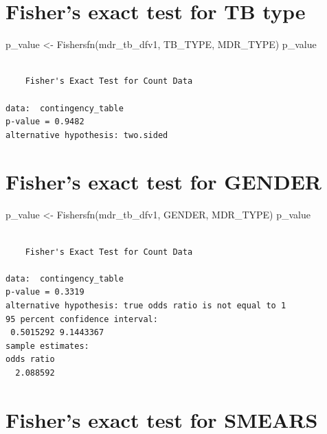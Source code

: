 \documentclass[
]{report}
\newenvironment{Shaded}{\begin{snugshade}}{\end{snugshade}}
\newcommand{\FunctionTok}[1]{\textcolor[rgb]{0.28,0.35,0.67}{#1}}
\newcommand{\NormalTok}[1]{\textcolor[rgb]{0.00,0.23,0.31}{#1}}
\newcommand{\OtherTok}[1]{\textcolor[rgb]{0.00,0.23,0.31}{#1}}
\newcommand{\StringTok}[1]{\textcolor[rgb]{0.13,0.47,0.30}{#1}}
\begin{document}
\hypertarget{fishers-exact-test-for-tb-type}{%
\section{Fisher's exact test for TB
type}\label{fishers-exact-test-for-tb-type}}

\begin{Shaded}
\begin{Highlighting}[]
\NormalTok{p\_value }\OtherTok{\textless{}{-}} \FunctionTok{Fishersfn}\NormalTok{(mdr\_tb\_dfv1, }\StringTok{\textquotesingle{}TB\_TYPE\textquotesingle{}}\NormalTok{, }\StringTok{\textquotesingle{}MDR\_TYPE\textquotesingle{}}\NormalTok{)}
\NormalTok{p\_value}
\end{Highlighting}
\end{Shaded}

\begin{verbatim}

    Fisher's Exact Test for Count Data

data:  contingency_table
p-value = 0.9482
alternative hypothesis: two.sided
\end{verbatim}

\hypertarget{fishers-exact-test-for-gender}{%
\section{Fisher's exact test for
GENDER}\label{fishers-exact-test-for-gender}}

\begin{Shaded}
\begin{Highlighting}[]
\NormalTok{p\_value }\OtherTok{\textless{}{-}} \FunctionTok{Fishersfn}\NormalTok{(mdr\_tb\_dfv1, }\StringTok{\textquotesingle{}GENDER\textquotesingle{}}\NormalTok{, }\StringTok{\textquotesingle{}MDR\_TYPE\textquotesingle{}}\NormalTok{)}
\NormalTok{p\_value}
\end{Highlighting}
\end{Shaded}

\begin{verbatim}

    Fisher's Exact Test for Count Data

data:  contingency_table
p-value = 0.3319
alternative hypothesis: true odds ratio is not equal to 1
95 percent confidence interval:
 0.5015292 9.1443367
sample estimates:
odds ratio 
  2.088592 
\end{verbatim}

\hypertarget{fishers-exact-test-for-smears}{%
\section{Fisher's exact test for
SMEARS}\label{fishers-exact-test-for-smears}}
\end{document}
